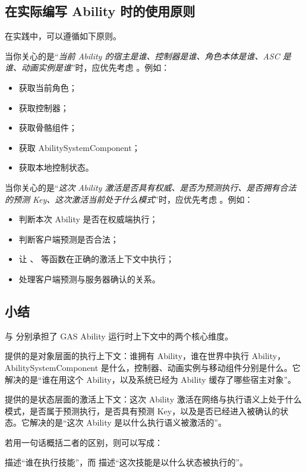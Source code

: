 \subsection{在实际编写 Ability 时的使用原则}

在实践中，可以遵循如下原则。

当你关心的是“\emph{当前 Ability 的宿主是谁、控制器是谁、角色本体是谁、ASC 是谁、动画实例是谁}”时，应优先考虑 。例如：
\begin{itemize}
	\item 获取当前角色；
	\item 获取控制器；
	\item 获取骨骼组件；
	\item 获取 AbilitySystemComponent；
	\item 获取本地控制状态。
\end{itemize}

当你关心的是“\emph{这次 Ability 激活是否具有权威、是否为预测执行、是否拥有合法的预测 Key、这次激活当前处于什么模式}”时，应优先考虑 。例如：
\begin{itemize}
	\item 判断本次 Ability 是否在权威端执行；
	\item 判断客户端预测是否合法；
	\item 让 、 等函数在正确的激活上下文中执行；
	\item 处理客户端预测与服务器确认的关系。
\end{itemize}

\subsection{小结}
 与  分别承担了 GAS Ability 运行时上下文中的两个核心维度。

 提供的是对象层面的执行上下文：谁拥有 Ability，谁在世界中执行 Ability，AbilitySystemComponent 是什么，控制器、动画实例与移动组件分别是什么。它解决的是“谁在用这个 Ability，以及系统已经为 Ability 缓存了哪些宿主对象”。

 提供的是状态层面的激活上下文：这次 Ability 激活在网络与执行语义上处于什么模式，是否属于预测执行，是否具有预测 Key，以及是否已经进入被确认的状态。它解决的是“这次 Ability 是以什么执行语义被激活的”。

若用一句话概括二者的区别，则可以写成：

\begin{marker}
	 描述“谁在执行技能”，而  描述“这次技能是以什么状态被执行的”。
\end{marker}

